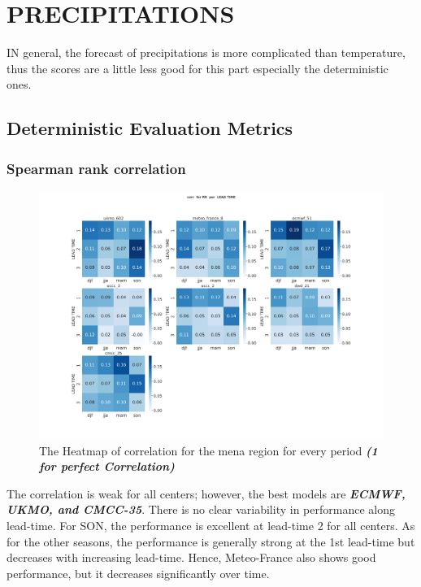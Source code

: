 \section{PRECIPITATIONS}
IN general, the forecast of precipitations is more complicated than temperature, thus the scores are a little less good for this part especially the deterministic ones. 
\subsection{Deterministic Evaluation Metrics}

\subsubsection{Spearman rank correlation}

\begin{figure}[H]
	\centering
	\includegraphics[scale=0.25]{plots/det/corr/corr_RR.png}
	\caption{The Heatmap of correlation for the mena region for every period \textbf{\textit{(1 for perfect Correlation)} }}
\end{figure}
The correlation is weak for all centers; however, the best models are \textbf{\textit{ECMWF, UKMO, and CMCC-35}}. There is no clear variability in performance along lead-time. For SON, the performance is excellent at lead-time 2 for all centers. As for the other seasons, the performance is generally strong at the 1st lead-time but decreases with increasing lead-time.
Hence, Meteo-France also shows good performance, but it decreases significantly over time.



